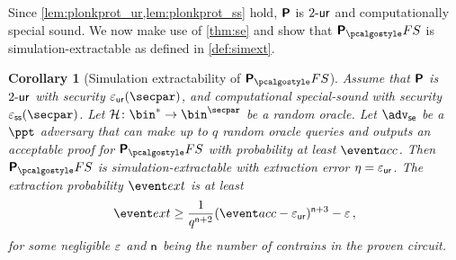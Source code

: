 \let\accentvec\vec \documentclass[runningheads]{llncs}
\newtheorem{corollary}[theorem]{Corollary} \theoremstyle{definition}
\begin{document}
Since \cref{lem:plonkprot_ur,lem:plonkprot_ss} hold, $\bm{\mathsf{P}}$ is ${2\text{-}\mathsf{ur}}$
and computationally special sound. We now 
make use of \cref{thm:se} and show that
$\plonkprot_\fs$ is simulation-extractable as defined in \cref{def:simext}.

\begin{corollary}[Simulation extractability of $\plonkprot_\fs$]
\label{thm:plonkprotfs_se}
Assume that $\bm{\mathsf{P}}$ is ${2\text{-}\mathsf{ur}}$ with security $\epsur(\secpar)$, and
computational special-sound with security $\epsss(\secpar)$. Let $\ro\colon
\bin^* \to \bin^\secpar$ be a random oracle. Let $\advse$ be a $\ppt$ adversary
that can make up to $q$ random oracle queries and outputs an acceptable proof
for $\plonkprotfs$ with probability at least $\accProb$. Then $\plonkprotfs$ is
simulation-extractable with extraction error $\eta = \varepsilon_{\mathsf{ur}}$. The extraction
probability $\extProb$ is at least
\[
	\extProb \geq \frac{1}{q^{\numberofconstrains + 2}} (\accProb - \epsur)^{\numberofconstrains + 3} -\eps\,,
\]
for some negligible $\varepsilon$ and $\mathsf{n}$ being the number of
contrains in the proven circuit.
\end{corollary}

\end{document}
